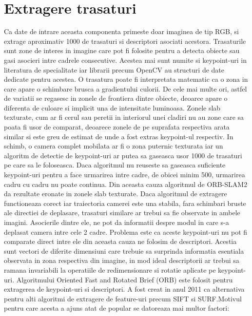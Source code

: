 \documentclass[12pt,a4paper]{report}
\begin{document}
\section{Extragere trasaturi} 
Ca date de intrare aceasta componenta primeste doar imaginea de tip RGB, si extrage
aproximativ 1000 de trasaturi si descriptori asociati acestora. Trasaturile sunt zone
de interes in imagine care pot fi folosite pentru a detecta obiecte sau gasi asocieri 
intre cadrele consecutive. Acestea mai sunt numite si keypoint-uri in literatura de 
specialitate iar librarii precum OpenCV au structuri de date dedicate pentru acestea.
O trasatura poate fi interpretata matematic ca o zona in care apare o schimbare 
brusca a gradientului culorii. De cele mai multe ori, astfel de variatii se regasesc 
in zonele de frontiera dintre obiecte, deoarce apare o diferenta
de culoare si implicit una de intensitate luminoasa. Zonele slab texturate, cum ar 
fi cerul sau peretii in interiorul unei cladiri nu au zone care sa poata fi usor de 
comparat, deoarece zonele de pe suprafata respectiva arata similar si este greu de 
estimat de unde a fost extras keypoint-ul respectiv. In schimb, o camera 
complet mobilata ar fi o zona puternic texturata iar un algoritm de detectie de 
keypoint-uri ar putea sa gaseasca usor 1000 de trasaturi pe care sa le foloseasca.
Daca algoritmul nu reuseste sa gaseasca suficiente keypoint-uri pentru a face urmarirea
intre cadre, de obicei minim 500, urmarirea cadru cu cadru nu poate continua. Din aceasta
cauza algoritmul de ORB-SLAM2 da rezultate eronate in zonele slab texturate. Daca algoritmul
de extragere functioneaza corect iar traiectoria camerei este una stabila, fara schimbari
bruste ale directiei de deplasare, trasaturi similare ar trebui sa fie observate in ambele
imagini. Asocierile dintre ele, ne pot da informatii despre modul in care s-a deplasat 
camera intre cele 2 cadre. Problema este ca aceste keypoint-uri nu pot fi comparate direct
intre ele din aceasta cauza ne folosim de descriptori. Acestia sunt vectori de diferite 
dimensiuni care trebuie sa surprinda informatia esentiala observata in zona respectiva din
imagine, in mod ideal descriptorii ar trebui sa ramana invariabili la operatiile de 
redimensionare si rotatie aplicate pe keypoint-uri. 
Algoritmului Oriented Fast and Rotated Brief (ORB) este folosit pentru extragerea de 
keypoint-uri si descriptori. A fost creat in anul 2011 ca alternativa pentru alti algoritmi
de extragere de feature-uri precum SIFT si SURF.\@ Motivul pentru care acesta a ajuns atat de popular 
se datoreaza mai multor factori:
\end{document}
